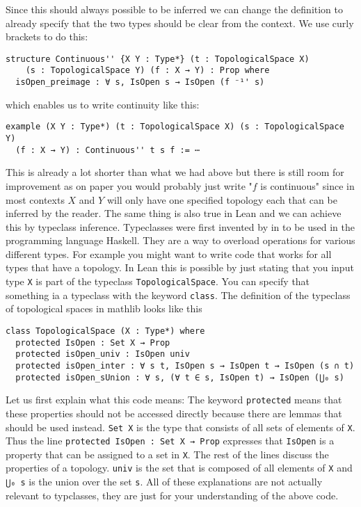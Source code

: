 Since this should always possible to be inferred we can change the definition to already specify that the two types should be clear from the context. 
We use curly brackets to do this: 

\begin{lstlisting}
structure Continuous'' {X Y : Type*} (t : TopologicalSpace X) 
    (s : TopologicalSpace Y) (f : X → Y) : Prop where
  isOpen_preimage : ∀ s, IsOpen s → IsOpen (f ⁻¹' s)
\end{lstlisting}

which enables us to write continuity like this: 

\begin{lstlisting}
example (X Y : Type*) (t : TopologicalSpace X) (s : TopologicalSpace Y) 
  (f : X → Y) : Continuous'' t s f := ⋯
\end{lstlisting}

This is already a lot shorter than what we had above but there is still room for improvement as on paper you would probably just write "$f$ is continuous" since in most contexts $X$ and $Y$ will only have one specified topology each that can be inferred by the reader.
The same thing is also true in Lean and we can achieve this by typeclass inference.
Typeclasses were first invented by  in \cite{Wadler1989} to be used in the programming language Haskell. 
They are a way to overload operations for various different types. 
For example you might want to write code that works for all types that have a topology. 
In Lean this is possible by just stating that you input type \lstinline{X} is part of the typeclass \lstinline{TopologicalSpace}. 
You can specify that something ia a typeclass with the keyword \lstinline{class}. 
The definition of the typeclass of topological spaces in mathlib looks like this

\begin{lstlisting}
class TopologicalSpace (X : Type*) where
  protected IsOpen : Set X → Prop
  protected isOpen_univ : IsOpen univ
  protected isOpen_inter : ∀ s t, IsOpen s → IsOpen t → IsOpen (s ∩ t)
  protected isOpen_sUnion : ∀ s, (∀ t ∈ s, IsOpen t) → IsOpen (⋃₀ s)
\end{lstlisting}

Let us first explain what this code means: 
The keyword \lstinline{protected} means that these properties should not be accessed directly because there are lemmas that should be used instead. 
\lstinline{Set X} is the type that consists of all sets of elements of \lstinline{X}.
Thus the line \lstinline{protected IsOpen : Set X → Prop} expresses that \lstinline{IsOpen} is a property that can be assigned to a set in \lstinline{X}.
The rest of the lines discuss the properties of a topology.
\lstinline{univ} is the set that is composed of all elements of \lstinline{X} and \lstinline{⋃₀ s} is the union over the set \lstinline{s}. 
All of these explanations are not actually relevant to typclasses, they are just for your understanding of the above code. 

